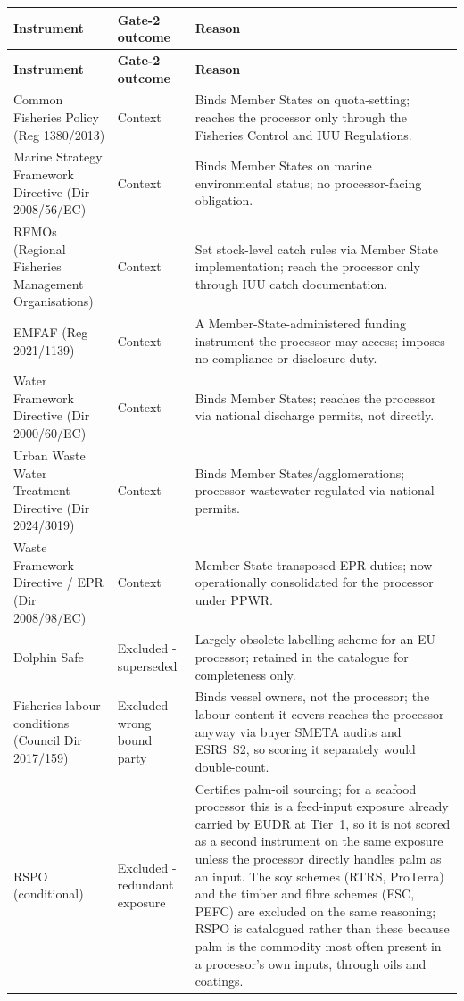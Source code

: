 \documentclass[
]{article}
\begin{document}
\begin{longtable}{@{}p{2.7cm}p{2.3cm}p{6.5cm}@{}}
\toprule
\textbf{Instrument} & \textbf{Gate-2 outcome} & \textbf{Reason} \\
\midrule
\endfirsthead
\toprule
\textbf{Instrument} & \textbf{Gate-2 outcome} & \textbf{Reason} \\
\midrule
\endhead
\bottomrule
\endfoot
Common Fisheries Policy (Reg 1380/2013) & Context & Binds Member States on quota-setting; reaches the processor only through the Fisheries Control and IUU Regulations. \\
Marine Strategy Framework Directive (Dir 2008/56/EC) & Context & Binds Member States on marine environmental status; no processor-facing obligation. \\
RFMOs (Regional Fisheries Management Organisations) & Context & Set stock-level catch rules via Member State implementation; reach the processor only through IUU catch documentation. \\
EMFAF (Reg 2021/1139) & Context & A Member-State-administered funding instrument the processor may access; imposes no compliance or disclosure duty. \\
Water Framework Directive (Dir 2000/60/EC) & Context & Binds Member States; reaches the processor via national discharge permits, not directly. \\
Urban Waste Water Treatment Directive (Dir 2024/3019) & Context & Binds Member States/agglomerations; processor wastewater regulated via national permits. \\
Waste Framework Directive / EPR (Dir 2008/98/EC) & Context & Member-State-transposed EPR duties; now operationally consolidated for the processor under PPWR. \\
Dolphin Safe & Excluded - superseded & Largely obsolete labelling scheme for an EU processor; retained in the catalogue for completeness only. \\
Fisheries labour conditions (Council Dir 2017/159) & Excluded - wrong bound party & Binds vessel owners, not the processor; the labour content it covers reaches the processor anyway via buyer SMETA audits and ESRS~S2, so scoring it separately would double-count. \\
RSPO (conditional) & Excluded - redundant exposure & Certifies palm-oil sourcing; for a seafood processor this is a feed-input exposure already carried by EUDR at Tier~1, so it is not scored as a second instrument on the same exposure unless the processor directly handles palm as an input. The soy schemes (RTRS, ProTerra) and the timber and fibre schemes (FSC, PEFC) are excluded on the same reasoning; RSPO is catalogued rather than these because palm is the commodity most often present in a processor's own inputs, through oils and coatings. \\

\end{longtable}
\end{document}
